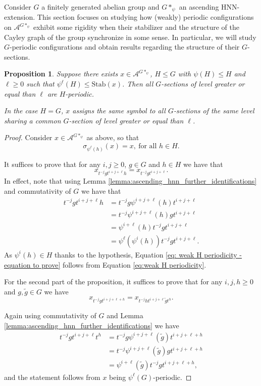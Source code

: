 \documentclass[cupthm,crop,info]{CUP-JNL-ETS}%
\theoremstyle{cupplain}
\newtheorem{proposition}[theorem]{Proposition}
\theoremstyle{cupdefinition}
\theoremstyle{cupremark}
\theoremstyle{cupproof}
\newtheorem{proof}{Proof}
\numberwithin{equation}{section}
\begin{document}
Consider $G$ a finitely generated abelian group and $G*_{\psi}$ an ascending HNN-extension. This section focuses on studying how (weakly) periodic configurations on $\mathcal{A}^{G*_{\psi}}$ exhibit some rigidity when their stabilizer and the structure of the Cayley graph of the group synchronize in some sense. In particular, we will study $G$-periodic configurations and obtain results regarding the structure of their $G$-sections.
\begin{proposition}\label{prop:ascending HNN extension periodicity}
	Suppose there exists $x\in \mathcal{A}^{G*_{\psi}}$, $H\leqslant G$ with $\psi(H)\leqslant H$ and $\ell \ge 0$ such that $\psi^{\ell}(H)\leqslant \mathrm{Stab}(x)$. Then all $G$-sections of level greater or equal than $\ell$ are $H$-periodic.
	
	In the case $H=G$, $x$ assigns the same symbol to all $G$-sections of the same level sharing a common $G$-section of level greater or equal than $\ell$.
\end{proposition}
\begin{proof}
	Consider $x\in \mathcal{A}^{G*_{\psi}}$ as above, so that
	\begin{equation}\label{eq:weak H periodicity}
	\sigma_{\psi^{\ell}(h)}(x)=x,\ \text{for all }h\in H.
	\end{equation}
	
	It suffices to prove that for any $i,j\ge 0$, $g\in G$ and $h\in H$ we have that
	\begin{equation}\label{eq: weak H periodicity - equation to prove}
	x_{t^{-j}gt^{i+j+\ell}h}=x_{t^{-j}gt^{i+j+\ell}}.
	\end{equation}
	In effect, note that using Lemma \ref{lemma:ascending_hnn_further_identifications} and commutativity of $G$ we have that
	\begin{align*}
	t^{-j}gt^{i+j+\ell}h&=t^{-j}g\psi^{i+j+\ell}(h)t^{i+j+\ell}	\\
	&=t^{-j}\psi^{i+j+\ell}(h)gt^{i+j+\ell}	\\
	&=\psi^{i+\ell}(h)t^{-j}gt^{i+j+\ell}\\
	&=\psi^{\ell}(\psi^i(h))t^{-j}gt^{i+j+\ell}.
	\end{align*}
	As $\psi^i(h)\in H$ thanks to the hypothesis, Equation \eqref{eq: weak H periodicity - equation to prove} follows from Equation  \eqref{eq:weak H periodicity}.
	
	
	For the second part of the proposition, it suffices to prove that for any $i,j,h\ge 0$ and $g,\tilde{g}\in G$ we have
	$$
	x_{t^{-j}gt^{i+j+\ell+h}}=x_{t^{-j}ht^{i+j+\ell}\tilde{g}t^h}.
	$$
	
	Again using commutativity of $G$ and Lemma \ref{lemma:ascending_hnn_further_identifications} we have
	\begin{align*}
	t^{-j}gt^{i+j+\ell}t^h&=t^{-j}g\psi^{i+j+\ell}(\tilde{g})t^{i+j+\ell+h}\\
	&=t^{-j}\psi^{i+j+\ell}(\tilde{g})gt^{i+j+\ell+h}\\
	&=\psi^{i+\ell}(\tilde{g})t^{-j}gt^{i+j+\ell+h},
	\end{align*}
	and the statement follows from $x$ being $\psi^{\ell}(G)$-periodic.
\end{proof}
\end{document}
